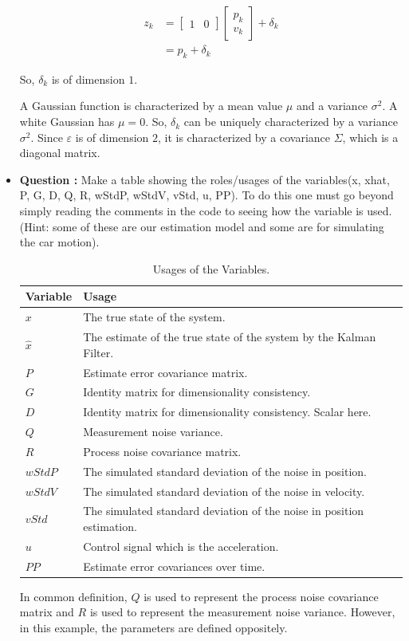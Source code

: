 \documentclass[11pt,a4paper]{article}
\begin{document}
\begin{itemize}
\begin{align}
				z_{k} &= \begin{bmatrix} 1 & 0 \end{bmatrix} \begin{bmatrix} p_{k} \\ v_{k} \end{bmatrix} + \delta_{k} \\
				&= p_{k} + \delta_{k}
			\end{align}
		\par So, $\delta_{k}$ is of dimension $1$.
		\par A Gaussian function is characterized by a mean value $\mu$ and a variance $\sigma^{2}$. A white Gaussian has $\mu = 0$. So, $\delta_{k}$ can be uniquely characterized by a variance $\sigma^{2}$. Since $\varepsilon$ is of dimension $2$, it is characterized by a covariance $\Sigma$, which is a diagonal matrix.

	\item \addtocounter{cnt_questions}{1} \textbf{Question :} Make a table showing the roles/usages of the variables(x, xhat, P, G, D, Q, R, wStdP, wStdV, vStd, u, PP).  To do this one must go beyond simply reading the comments in the code to seeing how the variable is used.  (Hint: some of these are our estimation model and some are for simulating the car motion).
		\begin{table}[H]
			\centering
			\caption{Usages of the Variables.}
			\begin{tabular}{p{}<{\centering}|p{}}
				\hline
				Variable & Usage \\ \hline
				$x$ & The true state of the system. \\
				$\hat{x}$ & The estimate of the true state of the system by the Kalman Filter. \\
				$P$ & Estimate error covariance matrix. \\
				$G$ & Identity matrix for dimensionality consistency. \\
				$D$ & Identity matrix for dimensionality consistency. Scalar here. \\
				$Q$ & Measurement noise variance. \\
				$R$ & Process noise covariance matrix. \\
				$wStdP$ & The simulated standard deviation of the noise in position. \\
				$wStdV$ & The simulated standard deviation of the noise in velocity. \\
				$vStd$ & The simulated standard deviation of the noise in position estimation. \\
				$u$ & Control signal which is the acceleration. \\
				$PP$ & Estimate error covariances over time. \\
				\hline
			\end{tabular}
			\label{tab:question2}
		\end{table}
		\par In common definition, $Q$ is used to represent the process noise covariance matrix and $R$ is used to represent the measurement noise variance. However, in this example, the parameters are defined oppositely.


\end{itemize}
\end{document}
